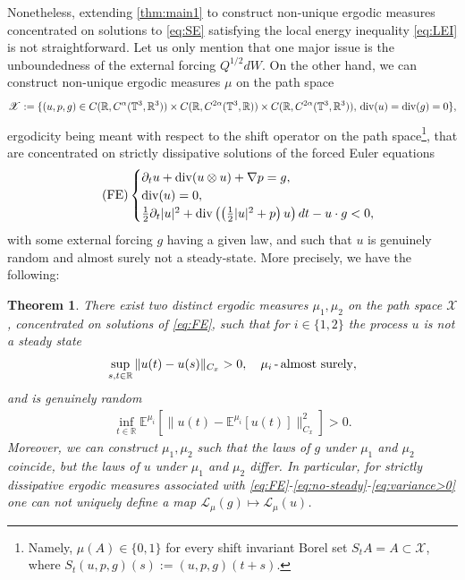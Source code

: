 \documentclass[10pt,a4paper]{amsart}
\numberwithin{equation}{section}
\newtheorem{thm}{Theorem}[section]
\numberwithin{corollario}{section}
\numberwithin{lemma}{section}
\numberwithin{prop}{section}
\theoremstyle{definition}
\theoremstyle{remark}
\newcommand{\R}{\mathbb{R}}
\newcommand{\T}{\mathbb{T}}
\newcommand{\dvg}{\mathord{{\rm div}}}
\begin{document}
Nonetheless, extending \autoref{thm:main1} to construct non-unique ergodic measures concentrated on solutions to \eqref{eq:SE} satisfying the local energy inequality \eqref{eq:LEI} is not straightforward.
Let us only mention that one major issue is the unboundedness of the external forcing $Q^{1/2}dW$.
On the other hand, we can construct non-unique ergodic measures $\mu$ on the path space 
\begin{align}
    \mathscr{X}:=\{ (u,p,g) \in C(\R, C^\alpha(\T^3,\R^3)) \times C(\R, C^{2\alpha}(\T^3,\R)) \times C(\R, C^{2\alpha}(\T^3,\R^3)), \, \dvg(u)=\dvg(g)=0\},
\end{align}
ergodicity being meant with respect to the shift operator on the path space\footnote{Namely, $\mu(A) \in \{0,1\}$ for every shift invariant Borel set $S_tA =A\subset \mathscr{X}$, where $S_t(u,p,g)(s) := (u,p,g)(t+s)$.
}, that are concentrated on strictly dissipative solutions of the forced Euler equations
\begin{align} \label{eq:FE} \tag{FE}
\begin{cases}
\partial_t u 
+
\dvg (u\otimes u) 
+
\nabla p  
=
g,
\\
\dvg(u) = 0,
\\
\frac12 \partial_t |u|^2
+
\dvg\left( \left( \frac12 |u|^2 + p \right) u \right)dt
-
u \cdot g
< 0,
\end{cases}
\end{align}
with some external forcing $g$ having a given law, and such that $u$ is genuinely random and almost surely not a steady-state.  
More precisely, we have the following:
\begin{thm} \label{thm:main2}
 There exist two distinct ergodic measures $\mu_1,\mu_2$ on the path space $\mathscr{X}$, concentrated on solutions of \eqref{eq:FE}, such that for $i \in \{1,2\}$ the process $u$ is not a steady state  
 \begin{align} \label{eq:no-steady}
     \sup_{s,t \in \R}   \| u(t)-u(s)\|_{C_x} > 0,
     \quad
     \mu_i\,\mbox{-\,almost surely},
 \end{align}
and is genuinely random
\begin{align} \label{eq:variance>0}
     \inf_{t \in \R} \mathbb{E}^{\mu_i} \left[ \| u(t)-\mathbb{E}^{\mu_i}[u(t)] \|^2_{C_x}\right]
        > 0.
\end{align}
 Moreover, we can construct $\mu_1,\mu_2$ such that the laws of $g$ under $\mu_1$ and $\mu_2$ coincide, but the laws of $u$ under $\mu_1$ and $\mu_2$ differ. In particular, for strictly dissipative ergodic measures associated with \eqref{eq:FE}-\eqref{eq:no-steady}-\eqref{eq:variance>0} one can not uniquely define a map $\mathscr{L}_{\mu}(g) \mapsto \mathscr{L}_{\mu}(u)$.
\end{thm}
\end{document}
